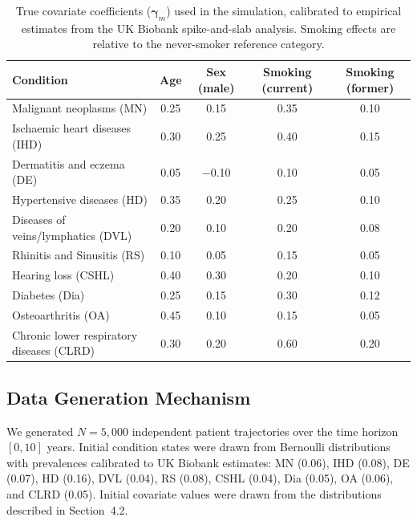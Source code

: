 \documentclass[12pt]{article}
\begin{document}
\begin{table}[H]
\footnotesize
\centering
\caption{True covariate coefficients ($\boldsymbol{\gamma}_m$) used in the simulation, calibrated to empirical estimates from the UK Biobank spike-and-slab analysis. Smoking effects are relative to the never-smoker reference category.}
\label{tab:sim_cov_coeffs}
\begin{tabular}{lcccc}
\hline
\textbf{Condition} & \textbf{Age} & \textbf{Sex (male)} & \textbf{Smoking (current)} & \textbf{Smoking (former)} \\
\hline
Malignant neoplasms (MN) & 0.25 & 0.15 & 0.35 & 0.10 \\
Ischaemic heart diseases (IHD) & 0.30 & 0.25 & 0.40 & 0.15 \\
Dermatitis and eczema (DE) & 0.05 & $-$0.10 & 0.10 & 0.05 \\
Hypertensive diseases (HD) & 0.35 & 0.20 & 0.25 & 0.10 \\
Diseases of veins/lymphatics (DVL) & 0.20 & 0.10 & 0.20 & 0.08 \\
Rhinitis and Sinusitis (RS) & 0.10 & 0.05 & 0.15 & 0.05 \\
Hearing loss (CSHL) & 0.40 & 0.30 & 0.20 & 0.10 \\
Diabetes (Dia) & 0.25 & 0.15 & 0.30 & 0.12 \\
Osteoarthritis (OA) & 0.45 & 0.10 & 0.15 & 0.05 \\
Chronic lower respiratory diseases (CLRD) & 0.30 & 0.20 & 0.60 & 0.20 \\
\hline
\end{tabular}
\end{table}

\subsection{Data Generation Mechanism}

We generated $N = 5{,}000$ independent patient trajectories over the time horizon $[0, 10]$ years. Initial condition states were drawn from Bernoulli distributions with prevalences calibrated to UK Biobank estimates: MN (0.06), IHD (0.08), DE (0.07), HD (0.16), DVL (0.04), RS (0.08), CSHL (0.04), Dia (0.05), OA (0.06), and CLRD (0.05). Initial covariate values were drawn from the distributions described in Section~4.2.
\end{document}
